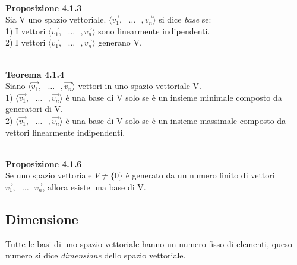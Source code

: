 \documentclass{article}
\begin{document}
\vspace{5px}
\textbf{\\Proposizione 4.1.3}
\\Sia V uno spazio vettoriale. $\langle \vec{v_1},\text{ }\dots\text{ },\vec{v_n}\rangle$ si dice \textit{base} se:
\vspace{2px}\\ 1) I vettori $\langle \vec{v_1},\text{ }\dots\text{ },\vec{v_n}\rangle$ sono linearmente indipendenti.
\vspace{2px}\\ 2) I vettori $\langle \vec{v_1},\text{ }\dots\text{ },\vec{v_n}\rangle$ generano V.

\vspace{5px}
\textbf{\\Teorema 4.1.4}
\\ Siano $\langle \vec{v_1},\text{ }\dots\text{ },\vec{v_n}\rangle$ vettori in uno spazio vettoriale V.
\vspace{2px}\\ 1) $\langle \vec{v_1},\text{ }\dots\text{ },\vec{v_n}\rangle$ è una base di V solo se è un insieme minimale composto da generatori di V.
\vspace{2px}\\ 2) $\langle \vec{v_1},\text{ }\dots\text{ },\vec{v_n}\rangle$  è una base di V solo se è un insieme massimale composto da vettori linearmente indipendenti.

\vspace{5px}
\textbf{\\Proposizione 4.1.6}
\\ Se uno spazio vettoriale $V \neq \{0\}$ è generato da un numero finito di vettori $\vec{v_1},\text{ }\dots\text{ }\vec{v_n}$, allora esiste una base di V.

\vspace{5px}
\subsection{Dimensione}
Tutte le basi di uno spazio vettoriale hanno un numero fisso di elementi, queso numero si dice \textit{dimensione} dello spazio vettoriale.
\end{document}
